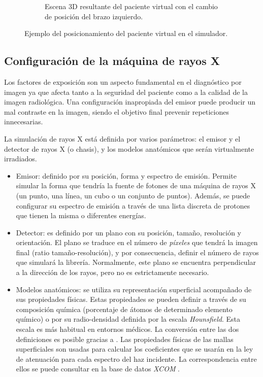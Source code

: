 \begin{figure}[ht]
\begin{subfigure}[b]{0.45\linewidth}
        \caption{Escena 3D resultante del paciente virtual con el cambio de posición del brazo izquierdo.\label{subfig:US-B}}
    \end{subfigure}
    \caption{\label{fig:pose} Ejemplo del posicionamiento del paciente virtual en el simulador.}
   \end{figure}



\subsection{Configuración de la máquina de rayos X}
\label{xray:setupxray}

Los factores de exposición son un aspecto fundamental en el diagnóstico por imagen ya que afecta tanto a la seguridad del paciente como a la calidad de la imagen radiológica. Una configuración inapropiada del emisor puede producir un mal contraste en la imagen, siendo el objetivo final prevenir repeticiones innecesarias.

La simulación de rayos X está definida por varios parámetros: el emisor y el detector de rayos X (o chasis), y los modelos anatómicos que serán virtualmente irradiados. 
\begin{itemize}
    \item Emisor: definido por su posición, forma y espectro de emisión. Permite simular la forma que tendría la fuente de fotones de una máquina de rayos X (un punto, una línea, un cubo o un conjunto de puntos). Además, se puede configurar su espectro de emisión a través de una lista discreta de protones que tienen la misma o diferentes energías.
    \item Detector: es definido por un plano con su posición, tamaño, resolución y orientación. El plano se traduce en el número de \emph{píxeles} que tendrá la imagen final (ratio tamaño-resolución), y por consecuencia, definir el número de rayos que simulará la librería. Normalmente, este plano se encuentra perpendicular a la dirección de los rayos, pero no es estrictamente necesario.
    \item Modelos anatómicos: se utiliza su representación superficial acompañado de sus propiedades físicas. Estas propiedades se pueden definir a través de su composición química (porcentaje de átomos de determinado elemento químico) o por su radio-densidad definida por la escala \emph{Hounsfield}. Esta escala es más habitual en entornos médicos. La conversión entre las dos definiciones es posible gracias a \cite{Schneider2000}. Las propiedades físicas de las mallas superficiales son usadas para calcular los coeficientes que se usarán en la ley de atenuación para cada espectro del haz incidente. La correspondencia entre ellos se puede consultar en la base de datos \emph{XCOM} \cite{XCOM}.
\end{itemize}

